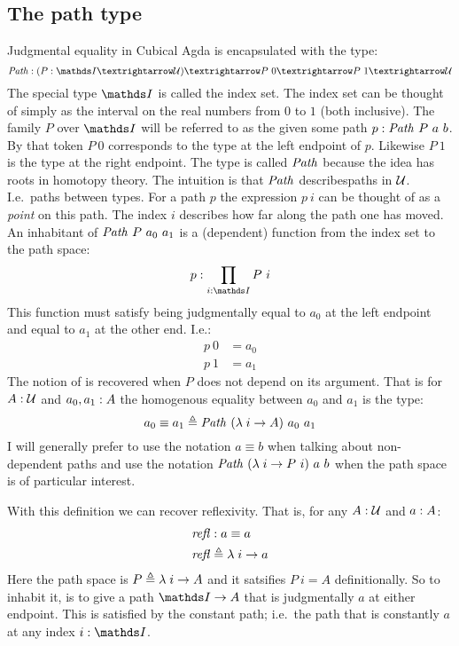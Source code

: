 \subsection{The path type}
Judgmental equality in Cubical Agda is encapsulated with the type:
%
\begin{equation}
\Path \tp (P \tp \I → \MCU) → P\ 0 → P\ 1 → \MCU
\end{equation}
%
The special type $\I$ is called the index set. The index set can be
thought of simply as the interval on the real numbers from $0$ to $1$
(both inclusive). The family $P$ over $\I$ will be referred to as the
 given some path $p \tp \Path\ P\ a\ b$. By
that token $P\ 0$ corresponds to the type at the left endpoint of $p$.
Likewise $P\ 1$ is the type at the right endpoint. The type is called
$\Path$ because the idea has roots in homotopy theory. The intuition
is that $\Path$ describes\linebreak[1] paths in $\mathcal{U}$. I.e.\ paths
between types. For a path $p$ the expression $p\ i$ can be thought of
as a \emph{point} on this path. The index $i$ describes how far along
the path one has moved. An inhabitant of $\Path\ P\ a_0\ a_1$ is a
(dependent) function from the index set to the path space:
%
$$
p \tp \prod_{i \tp \I} P\ i
$$
%
This function must satisfy being judgmentally equal to $a_0$ at the
left endpoint and equal to $a_1$ at the other end. I.e.:
%
\begin{align*}
  p\ 0 & = a_0 \\
  p\ 1 & = a_1
\end{align*}
%
The notion of  is recovered when $P$ does not
depend on its argument. That is for $A \mathrel{:} \mathcal{U}$ and $a_0, a_1 \mathrel{:} A$ the
homogenous equality between $a_0$ and $a_1$ is the type:
%
$$
a_0 \equiv a_1 \defeq \Path\ (\lambda\;i \to A)\ a_0\ a_1
$$
%
I will generally prefer to use the notation $a \equiv b$ when talking
about non-dependent paths and use the notation $\Path\ (\lambda\; i
\to P\ i)\ a\ b$ when the path space is of particular interest.

With this definition we can recover reflexivity. That is, for any $A
\mathrel{:} \mathcal{U}$ and $a \mathrel{:} A$:
%
\begin{equation}
\begin{aligned}
\refl & \tp a \equiv a \\
\refl & \defeq \lambda\; i \to a
\end{aligned}
\end{equation}
%
Here the path space is $P \mathrel{\triangleq} \lambda\; i \to A$ and it satsifies
$P\ i = A$ definitionally. So to inhabit it, is to give a path $\I \to
A$ that is judgmentally $a$ at either endpoint. This is satisfied by
the constant path; i.e.\ the path that is constantly $a$ at any index
$i \tp \I$.

